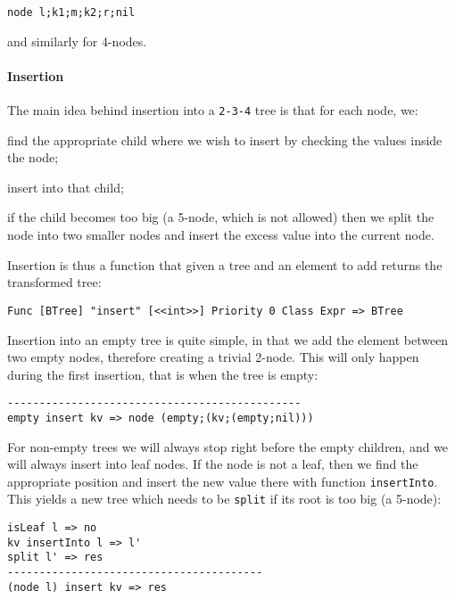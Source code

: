 \begin{lstlisting}
node l;k1;m;k2;r;nil
\end{lstlisting}

and similarly for 4-nodes.

\paragraph{Insertion}
The main idea behind insertion into a \texttt{2-3-4} tree is that for each node, we:
\begin{inparaenum}
\item find the appropriate child where we wish to insert by checking the values inside the node;
\item insert into that child;
\item if the child becomes too big (a 5-node, which is not allowed) then we split the node into two smaller nodes and insert the excess value into the current node.
\end{inparaenum}

Insertion is thus a function that given a tree and an element to add returns the transformed tree:

\begin{lstlisting}
Func [BTree] "insert" [<<int>>] Priority 0 Class Expr => BTree
\end{lstlisting}

Insertion into an empty tree is quite simple, in that we add the element between two empty nodes, therefore creating a trivial 2-node. This will only happen during the first insertion, that is when the tree is empty:

\begin{lstlisting}
----------------------------------------------
empty insert kv => node (empty;(kv;(empty;nil)))
\end{lstlisting}

For non-empty trees we will always stop right before the empty children, and we will always insert into leaf nodes. If the node is not a leaf, then we find the appropriate position and insert the new value there with function \texttt{insertInto}. This yields a new tree which needs to be \texttt{split} if its root is too big (a 5-node):

\begin{lstlisting}
isLeaf l => no
kv insertInto l => l'
split l' => res
----------------------------------------
(node l) insert kv => res
\end{lstlisting}

